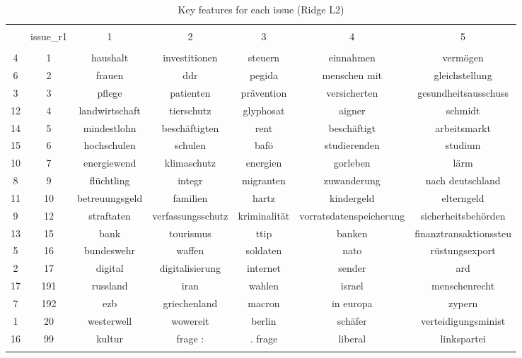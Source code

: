 
\begin{table}[!htbp] \centering 
  \caption{Key features for each issue (Ridge L2)} 
  \label{tab:key_feats} 
\begin{tabular}{@{\extracolsep{5pt}} ccccccc} 
\\[-1.8ex]\hline 
\hline \\[-1.8ex] 
 & issue\_r1 & 1 & 2 & 3 & 4 & 5 \\ 
\hline \\[-1.8ex] 
4 & 1 & haushalt & investitionen & steuern & einnahmen & vermögen \\ 
6 & 2 & frauen & ddr & pegida & menschen mit & gleichstellung \\ 
3 & 3 & pflege & patienten & prävention & versicherten & gesundheitsausschuss \\ 
12 & 4 & landwirtschaft & tierschutz & glyphosat & aigner & schmidt \\ 
14 & 5 & mindestlohn & beschäftigten & rent & beschäftigt & arbeitsmarkt \\ 
15 & 6 & hochschulen & schulen & bafö & studierenden & studium \\ 
10 & 7 & energiewend & klimaschutz & energien & gorleben & lärm \\ 
8 & 9 & flüchtling & integr & migranten & zuwanderung & nach deutschland \\ 
11 & 10 & betreuungsgeld & familien & hartz & kindergeld & elterngeld \\ 
9 & 12 & straftaten & verfassungsschutz & kriminalität & vorratsdatenspeicherung & sicherheitsbehörden \\ 
13 & 15 & bank & tourismus & ttip & banken & finanztransaktionssteu \\ 
5 & 16 & bundeswehr & waffen & soldaten & nato & rüstungsexport \\ 
2 & 17 & digital & digitalisierung & internet & sender & ard \\ 
17 & 191 & russland & iran & wahlen & israel & menschenrecht \\ 
7 & 192 & ezb & griechenland & macron & in europa & zypern \\ 
1 & 20 & westerwell & wowereit & berlin & schäfer & verteidigungsminist \\ 
16 & 99 & kultur & frage : & . frage & liberal & linkspartei \\ 
\hline \\[-1.8ex] 
\end{tabular} 
\end{table} 
